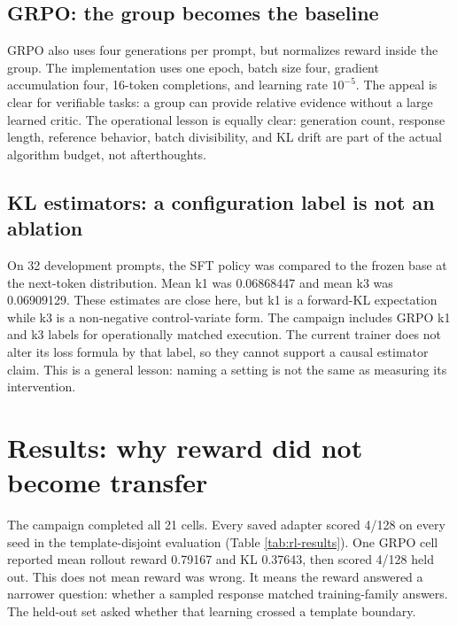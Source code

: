 \documentclass[10pt]{article}
\begin{document}
\subsection{GRPO: the group becomes the baseline}
GRPO also uses four generations per prompt, but normalizes reward inside the group. The implementation uses one epoch, batch size four, gradient accumulation four, 16-token completions, and learning rate $10^{-5}$. The appeal is clear for verifiable tasks: a group can provide relative evidence without a large learned critic. The operational lesson is equally clear: generation count, response length, reference behavior, batch divisibility, and KL drift are part of the actual algorithm budget, not afterthoughts.

\subsection{KL estimators: a configuration label is not an ablation}
On 32 development prompts, the SFT policy was compared to the frozen base at the next-token distribution. Mean k1 was 0.06868447 and mean k3 was 0.06909129. These estimates are close here, but k1 is a forward-KL expectation while k3 is a non-negative control-variate form. The campaign includes GRPO k1 and k3 labels for operationally matched execution. The current trainer does not alter its loss formula by that label, so they cannot support a causal estimator claim. This is a general lesson: naming a setting is not the same as measuring its intervention.

\section{Results: why reward did not become transfer}
The campaign completed all 21 cells. Every saved adapter scored 4/128 on every seed in the template-disjoint evaluation (Table \ref{tab:rl-results}). One GRPO cell reported mean rollout reward 0.79167 and KL 0.37643, then scored 4/128 held out. This does not mean reward was wrong. It means the reward answered a narrower question: whether a sampled response matched training-family answers. The held-out set asked whether that learning crossed a template boundary.
\end{document}

